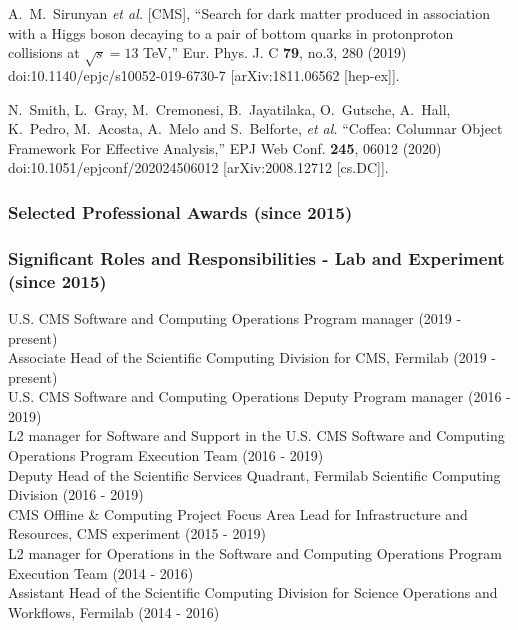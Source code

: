 \documentclass[9pt]{extarticle}
\begin{document}
A.~M.~Sirunyan \textit{et al.} [CMS],
``Search for dark matter produced in association with a Higgs boson decaying to a pair of bottom quarks in proton\textendash{}proton collisions at $\sqrt{s}=13$ TeV,''
Eur. Phys. J. C \textbf{79}, no.3, 280 (2019)
doi:10.1140/epjc/s10052-019-6730-7
[arXiv:1811.06562 [hep-ex]].

N.~Smith, L.~Gray, M.~Cremonesi, B.~Jayatilaka, O.~Gutsche, A.~Hall, K.~Pedro, M.~Acosta, A.~Melo and S.~Belforte, \textit{et al.}
``Coffea: Columnar Object Framework For Effective Analysis,''
EPJ Web Conf. \textbf{245}, 06012 (2020)
doi:10.1051/epjconf/202024506012
[arXiv:2008.12712 [cs.DC]].


\subsubsection*{Selected Professional Awards (since 2015)}




\subsubsection*{Significant Roles and Responsibilities - Lab and Experiment (since 2015)}

U.S. CMS Software and Computing Operations Program manager (2019 - present)\\
Associate Head of the Scientific Computing Division for CMS, Fermilab (2019 - present)\\
U.S. CMS Software and Computing Operations Deputy Program manager (2016 - 2019)\\
L2 manager for Software and Support in the U.S. CMS Software and Computing Operations Program Execution Team (2016 - 2019)\\
Deputy Head of the Scientific Services Quadrant, Fermilab Scientific Computing Division (2016 - 2019)\\
CMS Offline \& Computing Project Focus Area Lead for Infrastructure and Resources, CMS experiment (2015 - 2019)\\
L2 manager for Operations in the Software and Computing Operations Program Execution Team (2014 - 2016)\\
Assistant Head of the Scientific Computing Division for Science Operations and Workflows, Fermilab (2014 - 2016)
\end{document}
